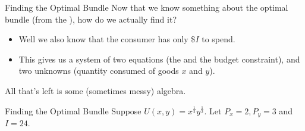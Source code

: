 \documentclass{beamer}
\begin{document}
\begin{frame}{Finding the Optimal Bundle}
  Now that we know something about the optimal bundle (from the ), how do we actually find it?

  \begin{itemize}
    \item Well we also know that the consumer has only  \$$I$ to spend.

    \item This gives us a system of two equations (the  and the budget constraint), and two unknowns (quantity consumed of goods $x$ and $y$).

  \end{itemize}
  
  \bigskip
  All that's left is some (sometimes messy) algebra.
\end{frame}

\begin{frame}{Finding the Optimal Bundle}
  Suppose $U(x,y) = x^{\frac{1}{2}}y^{\frac{1}{2}}$. Let $P_x = 2, P_y=3$ and $I = 24$.


\end{frame}
\end{document}
